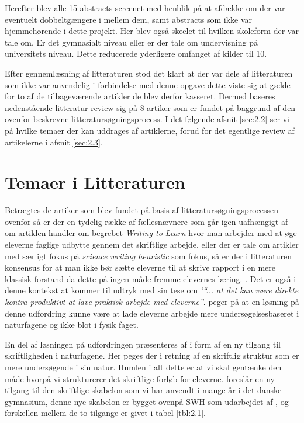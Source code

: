 Herefter blev alle 15 abstracts screenet med henblik på at afdække om der var eventuelt dobbeltgængere i mellem dem, samt abstracts som ikke var hjemmehørende i dette projekt. Her blev også skeelet til hvilken skoleform der var tale om. Er det gymnasialt niveau eller er der tale om undervisning på universitets niveau. Dette reducerede yderligere omfanget af kilder til 10.

Efter gennemlæsning af litteraturen stod det klart at der var dele af litteraturen som ikke var anvendelig i forbindelse med denne opgave dette viste sig at gælde for to af de tilbageværende artikler de blev derfor kasseret. Dermed baseres nedenstående litteratur review sig på 8 artiker som er fundet på baggrund af den ovenfor beskrevne litteratursøgningsprocess. I det følgende afsnit \vref{sec:2.2} ser vi på hvilke temaer der kan uddrages af artiklerne, forud for det egentlige review af artikelerne i afsnit \vref{sec:2.3}. 


\section{Temaer i Litteraturen}
\label{sec:2.2}

Betrægtes de artiker som blev fundet på basis af litteratursøgningsprocessen ovenfor så er der en tydelig række af fællesnævnere som går igen uafhængigt af om artiklen handler om begrebet \emph{Writing to Learn} hvor man arbejder med at øge eleverne faglige udbytte gennem det skriftlige arbejde. eller der er tale om artikler med særligt fokus på \emph{science writing heuristic} som fokus, så er der i litteraturen konsensus for at man ikke bør sætte eleverne til at skrive rapport i en mere klassisk forstand da dette på ingen måde fremme elevernes læring. \citep{Akkus2007, Atasoy2013, Burke2005, Keys1999}. Det er også i denne kontekst at \citet{Hodson2008} kommer til udtryk med sin tese om \emph{'``... at det kan være direkte kontra produktivt at lave praktisk arbejde med eleverne''}. \citet{Krogh2016,Dolin2014} peger på at en løsning på denne udfordring kunne være at lade eleverne arbejde mere undersøgelsesbaseret i naturfagene og ikke blot i fysik faget. 

En del af løsningen på udfordringen præsenteres af \citep{Keys1999, Burke2005} i form af en ny tilgang til skriftligheden i naturfagene. Her peges der i retning af en skriftlig struktur som er mere undersøgende i sin natur. Humlen i alt dette er at vi skal gentænke den måde hvorpå vi strukturerer det skriftlige forløb for eleverne. \citet{Burke2005} foreslår en ny tilgang til den skriftlige skabelon som vi har anvendt i mange år i det danske gymnasium, denne nye skabelon er bygget ovenpå SWH som udarbejdet af \citep{Keys1999}, og forskellen mellem de to tilgange er givet i tabel \vref{tbl:2.1}.

